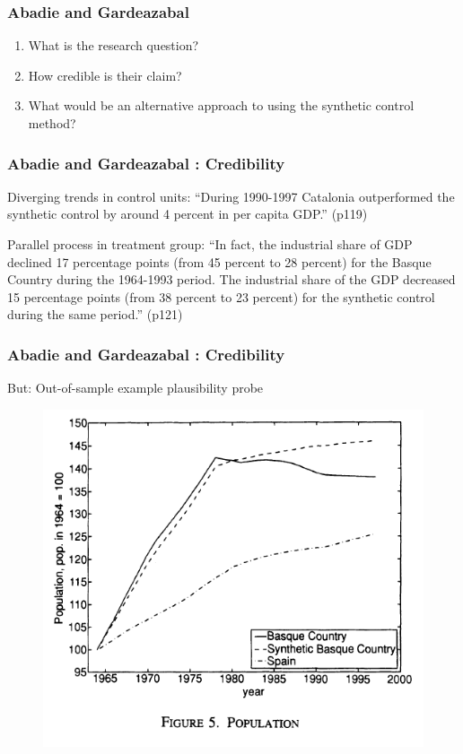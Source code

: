 \documentclass[12pt,english,dvipsnames,aspectratio=169,handout]{beamer}\usepackage[]{graphicx}\usepackage[]{xcolor}
\begin{document}
\begin{frame}
	\frametitle{Abadie and Gardeazabal \citeyear{abadie_economic_2003}}
	\begin{enumerate}
		\item What is the research question?
		\item How credible is their claim?
		\item What would be an alternative approach to using the synthetic control method?
	\end{enumerate}
\end{frame}


\begin{frame}
	\frametitle{Abadie and Gardeazabal \citeyear{abadie_economic_2003}: Credibility}
	\footnotesize
	Diverging trends in control units: ``During 1990-1997 Catalonia outperformed the synthetic control by around 4 percent in per capita GDP.'' (p119)
	
	Parallel process in treatment group: ``In fact, the industrial share of GDP declined 17 percentage points (from 45 percent to 28 percent) for the Basque Country during the 1964-1993 period. The industrial share of
the GDP decreased 15 percentage points (from 38 percent to 23 percent) for the synthetic control during the same period.'' (p121)

\end{frame}


\begin{frame}
	\frametitle{Abadie and Gardeazabal \citeyear{abadie_economic_2003}: Credibility}
	\footnotesize
    But: Out-of-sample example plausibility probe
  	 \begin{figure} 
    \includegraphics[height=.65\textheight,keepaspectratio=true]{../04-figures/08/12-ag_fig5}
    \end{figure} \scriptsize
\end{frame}
\end{document}
